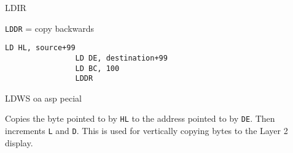 \begin{basedescript}{
    \desclabelstyle{\multilinelabel}
    \desclabelwidth{3cm}}
\begin{DetailItem}{LDIR}
\begin{multicols}{2}
            {\tt LDDR} = copy backwards
            \begin{lstlisting}[autogobble=true]
                LD HL, source+99
                LD DE, destination+99
                LD BC, 100
                LDDR
            \end{lstlisting}
        \end{multicols}

        \begin{DetailEffects}
            \FlagsLDIR
        \end{DetailEffects}
				
        \begin{DetailTiming}
        \end{DetailTiming}

    \end{DetailItem}


    \label{DetailRefLDWS}
    \begin{DetailItem}{LDWS\ZXN}
        {oa asp pecial}
        {\SymLDWS}

        Copies the byte pointed to by {\tt HL} to the address pointed to by {\tt DE}. Then increments {\tt L} and {\tt D}. This is used for vertically copying bytes to the Layer 2 display.
			
        \begin{DetailEffects}[v]
            \FlagsLDWS
        \end{DetailEffects}
				
        \begin{DetailTiming}
        \end{DetailTiming}




\end{DetailItem}
\end{basedescript}
